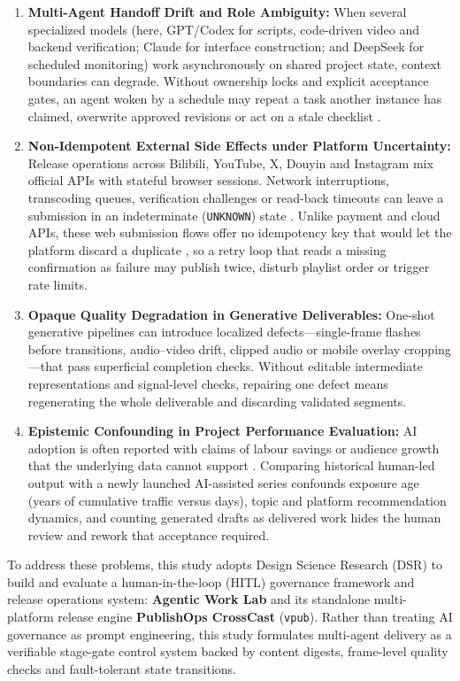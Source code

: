 \documentclass[11pt,a4paper]{article}
\theoremstyle{definition}
\begin{document}
\begin{enumerate}[leftmargin=1.8em]
    \item \textbf{Multi-Agent Handoff Drift and Role Ambiguity:} When several specialized models (here, GPT/Codex for scripts, code-driven video and backend verification; Claude for interface construction; and DeepSeek for scheduled monitoring) work asynchronously on shared project state, context boundaries can degrade. Without ownership locks and explicit acceptance gates, an agent woken by a schedule may repeat a task another instance has claimed, overwrite approved revisions or act on a stale checklist \citep{Whyte2016, Qian2024ChatDev}.
    \item \textbf{Non-Idempotent External Side Effects under Platform Uncertainty:} Release operations across Bilibili, YouTube, X, Douyin and Instagram mix official APIs with stateful browser sessions. Network interruptions, transcoding queues, verification challenges or read-back timeouts can leave a submission in an indeterminate (\texttt{UNKNOWN}) state \citep{Schneider1990, Kleppmann2017}. Unlike payment and cloud APIs, these web submission flows offer no idempotency key that would let the platform discard a duplicate \citep{Helland2012}, so a retry loop that reads a missing confirmation as failure may publish twice, disturb playlist order or trigger rate limits.
    \item \textbf{Opaque Quality Degradation in Generative Deliverables:} One-shot generative pipelines can introduce localized defects---single-frame flashes before transitions, audio--video drift, clipped audio or mobile overlay cropping---that pass superficial completion checks. Without editable intermediate representations and signal-level checks, repairing one defect means regenerating the whole deliverable and discarding validated segments.
    \item \textbf{Epistemic Confounding in Project Performance Evaluation:} AI adoption is often reported with claims of labour savings or audience growth that the underlying data cannot support \citep{Raisch2021}. Comparing historical human-led output with a newly launched AI-assisted series confounds exposure age (years of cumulative traffic versus days), topic and platform recommendation dynamics, and counting generated drafts as delivered work hides the human review and rework that acceptance required.
\end{enumerate}

To address these problems, this study adopts Design Science Research (DSR) \citep{Hevner2004, Peffers2007, Gregor2013, Venable2016} to build and evaluate a human-in-the-loop (HITL) governance framework and release operations system: \textbf{Agentic Work Lab} and its standalone multi-platform release engine \textbf{PublishOps CrossCast} (\texttt{vpub}). Rather than treating AI governance as prompt engineering, this study formulates multi-agent delivery as a verifiable stage-gate control system \citep{Cooper1990, Conforto2016, Bianchi2022} backed by content digests, frame-level quality checks and fault-tolerant state transitions.
\end{document}
